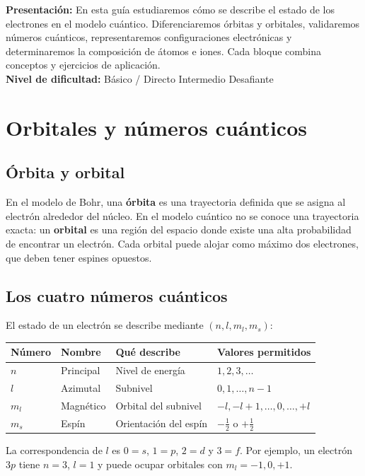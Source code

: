 \documentclass[12pt, letterpaper]{article}
\begin{document}

\vspace{4pt}
\begin{cuadroinfo}
  \small
  \textbf{Presentación:} En esta guía estudiaremos cómo se describe el estado de los electrones en el modelo cuántico. Diferenciaremos órbitas y orbitales, validaremos números cuánticos, representaremos configuraciones electrónicas y determinaremos la composición de átomos e iones. Cada bloque combina conceptos y ejercicios de aplicación.
  \\[4pt]
  \textbf{Nivel de dificultad:}\quad
  \facil{} Básico / Directo \quad
  \medio{} Intermedio \quad
  \dificil{} Desafiante
\end{cuadroinfo}

\vspace{8pt}

\section{Orbitales y números cuánticos}

\subsection{Órbita y orbital}
\begin{cuadroteoria}
  En el modelo de Bohr, una \textbf{órbita} es una trayectoria definida que se asigna al electrón alrededor del núcleo. En el modelo cuántico no se conoce una trayectoria exacta: un \textbf{orbital} es una región del espacio donde existe una alta probabilidad de encontrar un electrón. Cada orbital puede alojar como máximo dos electrones, que deben tener espines opuestos.
\end{cuadroteoria}

\subsection{Los cuatro números cuánticos}
\begin{cuadroteoria}
  El estado de un electrón se describe mediante $(n,l,m_l,m_s)$:
  \begin{center}
    \begin{tabular}{llll}
      \toprule
      Número & Nombre & Qué describe & Valores permitidos \\
      \midrule
      $n$ & Principal & Nivel de energía & $1,2,3,\ldots$ \\
      $l$ & Azimutal & Subnivel & $0,1,\ldots,n-1$ \\
      $m_l$ & Magnético & Orbital del subnivel & $-l,-l+1,\ldots,0,\ldots,+l$ \\
      $m_s$ & Espín & Orientación del espín & $-\tfrac12$ o $+\tfrac12$ \\
      \bottomrule
    \end{tabular}
  \end{center}
  La correspondencia de $l$ es $0=s$, $1=p$, $2=d$ y $3=f$. Por ejemplo, un electrón $3p$ tiene $n=3$, $l=1$ y puede ocupar orbitales con $m_l=-1,0,+1$.
\end{cuadroteoria}
\end{document}
